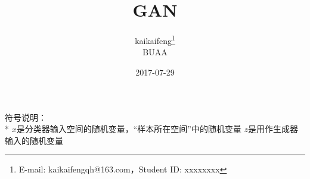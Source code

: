 \documentclass[a4paper, 11pt]{article}
\newcommand{\xiaosihao}{\fontsize{12pt}{\baselineskip}\selectfont}
\begin{document}
\begin{CJK}{UTF8}{gbsn}

\newtheorem{example}{例}             %
\newtheorem{algorithm}{算法}
\newtheorem{theorem}{定理}[section]  %
\newtheorem{definition}{定义}
\newtheorem{axiom}{公理}
\newtheorem{property}{性质}
\newtheorem{proposition}{命题}
\newtheorem{lemma}{引理}
\newtheorem{corollary}{推论}
\newtheorem{remark}{注解}
\newtheorem{condition}{条件}
\newtheorem{conclusion}{结论}
\newtheorem{assumption}{假设}

\renewcommand{\contentsname}{目录}  %
\renewcommand{\abstractname}{摘要}  %
\renewcommand{\refname}{参考文献}   %
\renewcommand{\indexname}{索引}
\renewcommand{\figurename}{图}
\renewcommand{\tablename}{表}
\renewcommand{\appendixname}{附录}


\title{GAN\\}
\author{kaikaifeng\footnote{E-mail: kaikaifengqh@163.com，Student ID: xxxxxxxx}\\[2ex]
\xiaosihao BUAA\\[2ex]
}
\date{2017-07-29}


\maketitle

\newpage

\noindent 符号说明：\\*
$x$是分类器输入空间的随机变量，“样本所在空间”中的随机变量
$z$是用作生成器输入的随机变量


\end{CJK}
\end{document}

